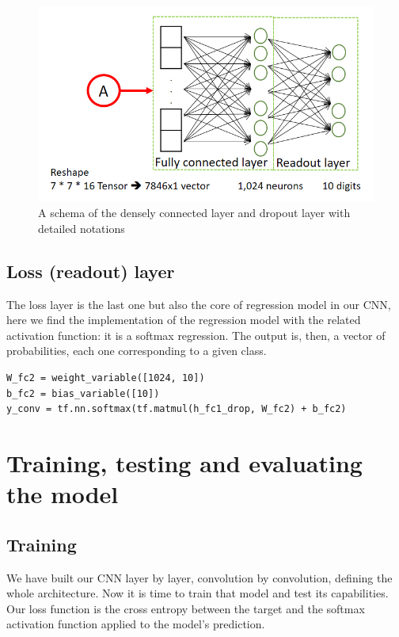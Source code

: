 \begin{figure}
	\centering
	\includegraphics[width=1\textwidth]{Images/other_layers}
	\caption{A schema of the densely connected layer and dropout layer with detailed notations}
	\label{fig:other_layers}
\end{figure}

\subsection{Loss (readout) layer}

The loss layer is the last one but also the core of regression model in our \acs{CNN}, here we find the implementation of the regression model with the related activation function: it is a softmax regression. The output is, then, a vector of probabilities, each one corresponding to a given class.

\begin{lstlisting}
W_fc2 = weight_variable([1024, 10])
b_fc2 = bias_variable([10])
y_conv = tf.nn.softmax(tf.matmul(h_fc1_drop, W_fc2) + b_fc2)
\end{lstlisting}

\section{Training, testing and evaluating the model}

\subsection{Training}

We have built our \acs{CNN} layer by layer, convolution by convolution, defining the whole architecture. Now it is time to train that model and test its capabilities. Our loss function is the cross entropy between the target and the softmax activation function applied to the model's prediction.


